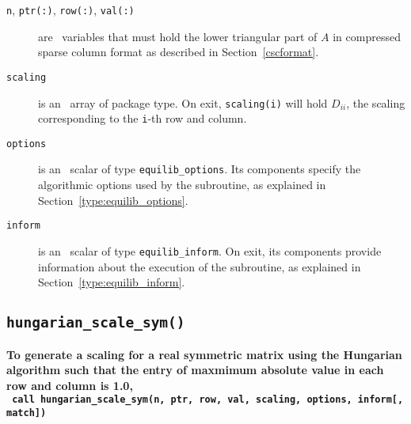 \begin{description}

\item[\texttt{n}, \texttt{ptr(:)}, \texttt{row(:)}, \texttt{val(:)}] are \intentin\ variables that must hold the lower triangular part of $A$ in compressed sparse column format as described in Section~\ref{cscformat}.

\item[\texttt{scaling}] is an \intentout\ array of package type. On exit,
\texttt{scaling(i)} will hold $D_{ii}$, the scaling corresponding to the
\texttt{i}-th row and column.

\item[\texttt{options}] is an \intentin\ scalar of type \texttt{equilib\_options}. Its components specify the algorithmic options used by the subroutine, as explained in Section~\ref{type:equilib_options}.

\item[\texttt{inform}] is an \intentout\ scalar of type \texttt{equilib\_inform}. On exit, its components provide information about the execution of the subroutine, as explained in Section~\ref{type:equilib_inform}.

\end{description}


\subsection{\texttt{hungarian\_scale\_sym()}}

\textbf{\noindent
   To generate a scaling for a real symmetric matrix using the Hungarian algorithm such that the entry of maxmimum absolute value in each row and column is 1.0,
   \vspace*{0.1cm} \\
   \texttt{ \hspace*{0.2cm}
      call hungarian\_scale\_sym(n, ptr, row, val, scaling, options, inform[, match])
   }
   \vspace{0.3cm}
}

